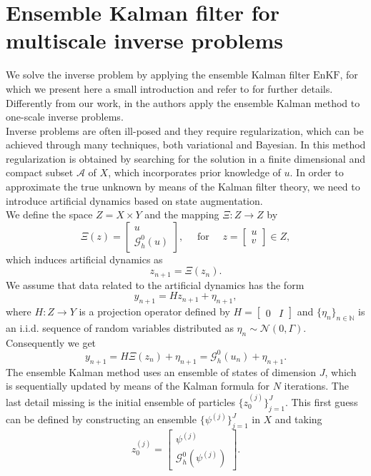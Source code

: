 \documentclass[10pt]{article}
\begin{document}
\section{Ensemble Kalman filter for multiscale inverse problems}

We solve the inverse problem by applying the ensemble Kalman filter $\mathrm{EnKF}$, for which we present here a small introduction and refer to \cite{ILS13} for further details. Differently from our work, in \cite{ILS13} the authors apply the ensemble Kalman method to one-scale inverse problems. \\
Inverse problems are often ill-posed and they require regularization, which can be achieved through many techniques, both variational and Bayesian. In this method regularization is
obtained by searching for the solution in a finite dimensional and compact subset $\mathcal{A}$ of $X$, which incorporates prior knowledge of $u$. In order to approximate the true unknown by means of the Kalman filter theory, we need to introduce artificial dynamics based on state augmentation. \\
We define the space $Z = X \times Y$ and the mapping $\Xi \colon Z \to Z$ by 
\[ \Xi(z) = \begin{bmatrix} u \\ \mathcal{G}^0_h(u) \end{bmatrix}, \quad \text{ for } \quad z = \begin{bmatrix} u \\ v \end{bmatrix} \in Z, \]
which induces artificial dynamics as
\[ z_{n+1} = \Xi(z_n). \]
We assume that data related to the artificial dynamics has the form
\[ y_{n+1} = H z_{n+1} + \eta_{n+1}, \]
where $H \colon Z \to Y$ is a projection operator defined by $H = \begin{bmatrix} 0 & I \end{bmatrix}$ and
$\{ \eta_n \}_{n \in \mathbb{N}}$ is an i.i.d. sequence of random variables distributed as $\eta_n \sim \mathcal{N}(0,\Gamma)$.
Consequently we get 
\[ y_{n+1} = H \Xi(z_n) + \eta_{n+1} = \mathcal{G}^0_h(u_n) + \eta_{n+1}. \]
The ensemble Kalman method uses an ensemble of states of dimension $J$, which is sequentially updated by means of the Kalman formula for $N$ iterations. The last detail missing  is the initial ensemble of particles $\{ z_0^{(j)} \}_{j = 1}^J$. This first guess can be defined by constructing an ensemble $\{ \psi^{(j)} \}_{j = 1}^J$ in $X$ and taking 
\begin{equation*}
z_0^{(j)} = \begin{bmatrix} \psi^{(j)} \\ \mathcal{G}^0_h(\psi^{(j)}) \end{bmatrix}.
\end{equation*}
\end{document}
